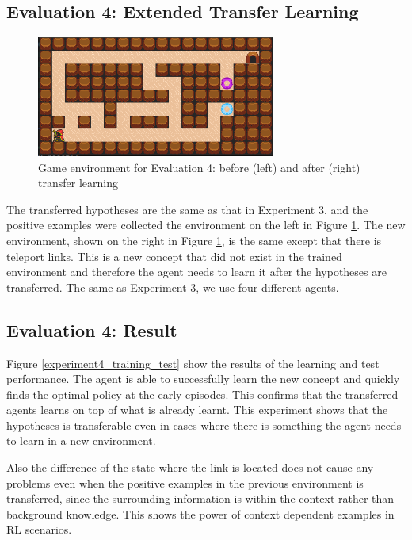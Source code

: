 \subsection{Evaluation 4: Extended Transfer Learning}
\label{subsec:experiement4_setup}
\begin{figure}[!htb]
\centering
\includegraphics[width=0.7\textwidth]{./figures/experiment4_after}
\caption{Game environment for Evaluation 4: before (left) and after (right) transfer learning}
\label{experiment4_setup}
\end{figure}

The transferred hypotheses are the same as that in Experiment 3, and the positive examples were collected the environment on the left in Figure \ref{experiment4_setup}.
The new environment, shown on the right in Figure \ref{experiment4_setup}, is the same except that there is teleport links.
This is a new concept that did not exist in the trained environment and therefore the agent needs to learn it after the hypotheses are transferred.
The same as Experiment 3, we use four different agents.

\subsection{Evaluation 4: Result}
\label{subsec:experiment_result_4}

Figure \ref{experiment4_training_test} show the results of the learning and test performance. 
The agent is able to successfully learn the new concept and quickly finds the optimal policy at the early episodes.
This confirms that the transferred agents learns on top of what is already learnt. This experiment shows that the hypotheses is transferable even in cases where there is something the agent needs to learn in a new environment.

Also the difference of the state where the link is located does not cause any problems even when the positive examples in the previous environment is transferred, since the surrounding information is within the context rather than background knowledge. 
This shows the power of context dependent examples in RL scenarios.

